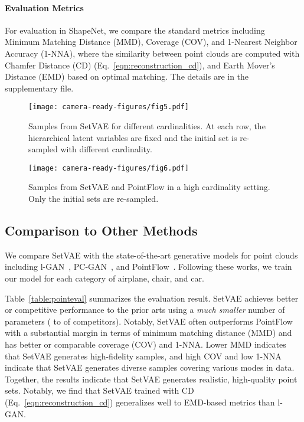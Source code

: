 \documentclass[final]{arxiv/cvpr}
\newcommand{\cutparagraphup}{\vspace*{-0.1in}}
\begin{document}
\cutparagraphup
\paragraph{Evaluation Metrics}
For evaluation in ShapeNet, we compare the standard metrics including Minimum Matching Distance (MMD), Coverage (COV), and 1-Nearest Neighbor Accuracy (1-NNA), where the similarity between point clouds are computed with Chamfer Distance (CD) (Eq.~\eqref{eqn:reconstruction_cd}), and Earth Mover's Distance (EMD) based on optimal matching.
The details are in the supplementary file.

\begin{figure}[!t]
    \centering
    \texttt{[image: camera-ready-figures/fig5.pdf]}
    \vspace{-0.7cm}
    \caption{
    Samples from SetVAE for different cardinalities. At each row, the hierarchical latent variables are fixed and the initial set is re-sampled with different cardinality.
    }
    \label{fig:cardinality}
    \vspace{-0.5cm}
\end{figure}
\begin{figure}[!t]
    \centering
    \texttt{[image: camera-ready-figures/fig6.pdf]}
    \vspace{-0.15cm}
    \caption{
    Samples from SetVAE and PointFlow in a high cardinality setting. Only the initial sets are re-sampled.
    }
    \label{fig:mega-cardinality}
    \vspace{-0.5cm}
\end{figure}

\subsection{Comparison to Other Methods}
We compare SetVAE with the state-of-the-art generative models for point clouds including l-GAN~\cite{achlioptas2018learning}, PC-GAN~\cite{li2018point}, and PointFlow~\cite{yang2019pointflow}.
Following these works, we train our model for each category of airplane, chair, and car.


Table~\ref{table:pointeval} summarizes the evaluation result.
SetVAE achieves better or competitive performance to the prior arts using a \emph{much smaller} number of parameters ( to  of competitors).
Notably, SetVAE often outperforms PointFlow with a substantial margin in terms of minimum matching distance (MMD) and has better or comparable coverage (COV) and 1-NNA.
Lower MMD indicates that SetVAE generates high-fidelity samples, and high COV and low 1-NNA indicate that SetVAE generates diverse samples covering various modes in data.
Together, the results indicate that SetVAE generates realistic, high-quality point sets.
Notably, we find that SetVAE trained with CD (Eq.~\eqref{eqn:reconstruction_cd}) generalizes well to EMD-based metrics than l-GAN.
\end{document}
